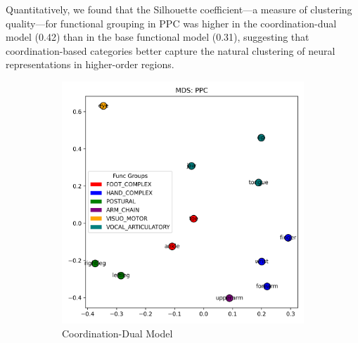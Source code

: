 \documentclass{article}
\begin{document}
Quantitatively, we found that the Silhouette coefficient—a measure of clustering quality—for functional grouping in PPC was higher in the coordination-dual model (0.42) than in the base functional model (0.31), suggesting that coordination-based categories better capture the natural clustering of neural representations in higher-order regions.

\begin{figure}[!htbp]
    \centering
    \begin{subfigure}[b]{0.45\textwidth}
        \centering
        \includegraphics[width=\textwidth]{results/coordination_dual/mds_PPC.png}
        \caption{Coordination-Dual Model}
        \label{fig:mds_coord_dual}
    \end{subfigure}
    \hfill
    \begin{subfigure}[b]{0.45\textwidth}
        \centering

\end{subfigure}
\end{figure}
\end{document}
